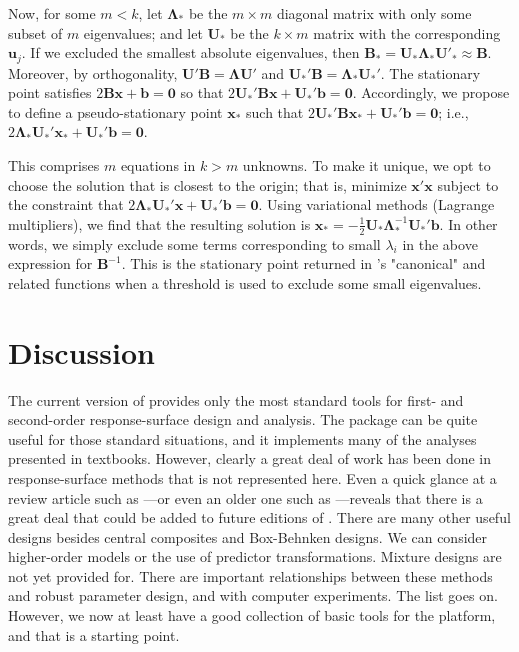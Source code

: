 \documentclass[article,nojss]{jss}
\def\rsm{\pkg{rsm}}
\def\R{\proglang{R}}
\def\bb{\mathbf{b}}
\def\bB{\mathbf{B}}
\def\bu{\mathbf{u}}
\def\bU{\mathbf{U}}
\def\bLambda{\pmb{\Lambda}}
\def\bx{\mathbf{x}}
\def\bzero{\mathbf{0}}
\begin{document}
Now, for some $m<k$, let $\bLambda_*$ be the $m\times m$ diagonal matrix with only some subset of $m$ eigenvalues; and let  $\bU_*$ be the $k \times m$ matrix with the corresponding $\bu_j$. If we excluded the smallest absolute eigenvalues, then $\bB_* = \bU_*\bLambda_*\bU'_* \approx \bB$. Moreover, by orthogonality, $\bU'\bB = \bLambda\bU'$ and $\bU_*'\bB = \bLambda_*\bU_*'$.
The stationary point satisfies $2\bB\bx + \bb = \bzero$ so that $2\bU_*'\bB\bx + \bU_*'\bb = \bzero$. Accordingly, we propose to define a pseudo-stationary point $\bx_*$ such that $2\bU_*'\bB\bx_* + \bU_*'\bb = \bzero$; i.e., $2\bLambda_*\bU_*'\bx_* + \bU_*'\bb = \bzero$. 

This comprises $m$ equations in $k>m$ unknowns. 
To make it unique, we opt to choose the solution that is closest to the origin;
that is, minimize $\bx'\bx$ subject to the constraint that $2\bLambda_*\bU_*'\bx + \bU_*'\bb = \bzero$.
Using variational methods (Lagrange multipliers), we find that the resulting solution is $\bx_*= -\frac12\bU_*\bLambda_*^{-1}\bU_*'\bb$. In other words, we simply exclude some terms corresponding to small $\lambda_i$ in the above expression for $\bB^{-1}$.
This is the stationary point returned in \rsm's "canonical" and related functions when a threshold is used to exclude some small eigenvalues.


\section{Discussion}
The current version of \rsm{} provides only the most standard tools for first- and second-order response-surface design and analysis.  The package can be quite useful for those standard situations, and it implements many of the analyses presented in textbooks.  However, clearly a great deal of work has been done in response-surface methods that is not represented here.
Even a quick glance at a review article such as \cite{Mye04}---or even an older one such as \cite{Hil89}---reveals that there is a great deal that could be added to future editions of \rsm{}.  There are many other useful designs besides central composites and Box-Behnken designs.  We can consider higher-order models or the use of predictor transformations.  Mixture designs are not yet provided for.  There are important relationships between these methods and robust parameter design, and with computer experiments.  The list goes on.  However, we now at least have a good collection of basic tools for the \R{} platform, and that is a starting point.

\clearpage



\end{document}
